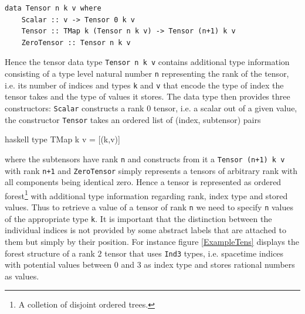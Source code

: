 \documentclass[a4paper,12pt, DIV=14, BCOR=5mm, twoside, headsepline]{scrbook}
\begin{document}
\begin{samepage}
\begin{verbatim}
data Tensor n k v where 
    Scalar :: v -> Tensor 0 k v 
    Tensor :: TMap k (Tensor n k v) -> Tensor (n+1) k v
    ZeroTensor :: Tensor n k v
\end{verbatim} 
\end{samepage}

Hence the tensor data type \texttt{Tensor n k v} contains additional type information consisting of a type level natural number \texttt{n} representing the rank of the tensor, i.e. its number of indices and types \texttt{k} and \texttt{v} that encode the type of index the tensor takes and the type of values it stores. The data type then provides three constructors: \texttt{Scalar} constructs a rank 0 tensor, i.e. a scalar out of a given value, the constructor \texttt{Tensor} takes an ordered list of (index, subtensor) pairs
\begin{center}
\begin{cminted}{haskell}
type TMap k v = [(k,v)]
\end{cminted}
\end{center}
where the subtensors have rank \texttt{n} and constructs from it a \texttt{Tensor (n+1) k v} with rank \texttt{n+1} and \texttt{ZeroTensor} simply represents a tensors of arbitrary rank with all components being identical zero. Hence a tensor is represented as ordered forest\footnote{A colletion of disjoint ordered trees.} with additional type information regarding rank, index type and stored values.
Thus to retrieve a value of a tensor of rank \texttt{n} we need to specify \texttt{n} values of the appropriate type \texttt{k}. It is important that the distinction between the individual indices is not provided by some abstract labels that are attached to them but simply by their position. For instance figure \ref{ExampleTens} displays the forest structure of a rank $2$ tensor that uses \texttt{Ind3} types, i.e. spacetime indices with potential values between $0$ and $3$ as index type and stores rational numbers as values.
\end{document}

